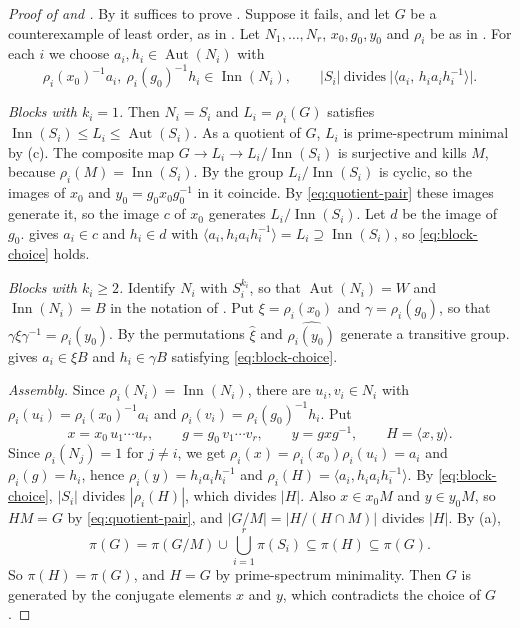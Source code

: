 \documentclass[11pt,colorlinks]{charlie}
\DeclareMathOperator{\Aut}{Aut}
\DeclareMathOperator{\Inn}{Inn}
\newcommand{\gen}[1]{\langle #1\rangle}
\begin{document}
\begin{proof}[Proof of  and ]
By  it suffices to prove . Suppose it fails, and let $G$ be a counterexample of least order, as in . Let $N_1,\dots,N_r$, $x_0,g_0,y_0$ and $\rho_i$ be as in . For each $i$ we choose $a_i,h_i\in\Aut(N_i)$ with
\begin{equation}\label{eq:block-choice}
 \rho_i(x_0)^{-1}a_i,\ \rho_i(g_0)^{-1}h_i\in\Inn(N_i),\qquad |S_i|\ \text{divides}\ \bigl|\gen{a_i,\,h_ia_ih_i^{-1}}\bigr|.
\end{equation}

\emph{Blocks with $k_i=1$.} Then $N_i=S_i$ and $L_i=\rho_i(G)$ satisfies $\Inn(S_i)\le L_i\le\Aut(S_i)$. As a quotient of $G$, $L_i$ is prime-spectrum minimal by (c). The composite map $G\to L_i\to L_i/\Inn(S_i)$ is surjective and kills $M$, because $\rho_i(M)=\Inn(S_i)$. By  the group $L_i/\Inn(S_i)$ is cyclic, so the images of $x_0$ and $y_0=g_0x_0g_0^{-1}$ in it coincide. By \eqref{eq:quotient-pair} these images generate it, so the image $c$ of $x_0$ generates $L_i/\Inn(S_i)$. Let $d$ be the image of $g_0$.  gives $a_i\in c$ and $h_i\in d$ with $\gen{a_i,h_ia_ih_i^{-1}}=L_i\supseteq\Inn(S_i)$, so \eqref{eq:block-choice} holds.

\emph{Blocks with $k_i\ge2$.} Identify $N_i$ with $S_i^{k_i}$, so that $\Aut(N_i)=W$ and $\Inn(N_i)=B$ in the notation of . Put $\xi=\rho_i(x_0)$ and $\gamma=\rho_i(g_0)$, so that $\gamma\xi\gamma^{-1}=\rho_i(y_0)$. By  the permutations $\hat\xi$ and $\widehat{\rho_i(y_0)}$ generate a transitive group.  gives $a_i\in\xi B$ and $h_i\in\gamma B$ satisfying \eqref{eq:block-choice}.

\emph{Assembly.} Since $\rho_i(N_i)=\Inn(N_i)$, there are $u_i,v_i\in N_i$ with $\rho_i(u_i)=\rho_i(x_0)^{-1}a_i$ and $\rho_i(v_i)=\rho_i(g_0)^{-1}h_i$. Put
\[
 x=x_0\,u_1\cdots u_r,\qquad g=g_0\,v_1\cdots v_r,\qquad y=gxg^{-1},\qquad H=\gen{x,y}.
\]
Since $\rho_i(N_j)=1$ for $j\ne i$, we get $\rho_i(x)=\rho_i(x_0)\rho_i(u_i)=a_i$ and $\rho_i(g)=h_i$, hence $\rho_i(y)=h_ia_ih_i^{-1}$ and $\rho_i(H)=\gen{a_i,h_ia_ih_i^{-1}}$. By \eqref{eq:block-choice}, $|S_i|$ divides $|\rho_i(H)|$, which divides $|H|$. Also $x\in x_0M$ and $y\in y_0M$, so $HM=G$ by \eqref{eq:quotient-pair}, and $|G/M|=|H/(H\cap M)|$ divides $|H|$. By (a),
\[
 \pi(G)=\pi(G/M)\cup\bigcup_{i=1}^r\pi(S_i)\subseteq\pi(H)\subseteq\pi(G).
\]
So $\pi(H)=\pi(G)$, and $H=G$ by prime-spectrum minimality. Then $G$ is generated by the conjugate elements $x$ and $y$, which contradicts the choice of $G$.
\end{proof}
\end{document}
